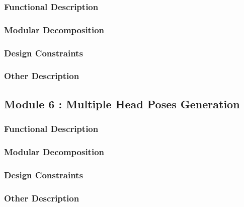 \subsubsection{Functional Description}
\subsubsection{Modular Decomposition}
\subsubsection{Design Constraints}
\subsubsection{Other Description}

\subsection{Module 6 : Multiple Head Poses Generation}
\subsubsection{Functional Description}
\subsubsection{Modular Decomposition}
\subsubsection{Design Constraints}
\subsubsection{Other Description}
